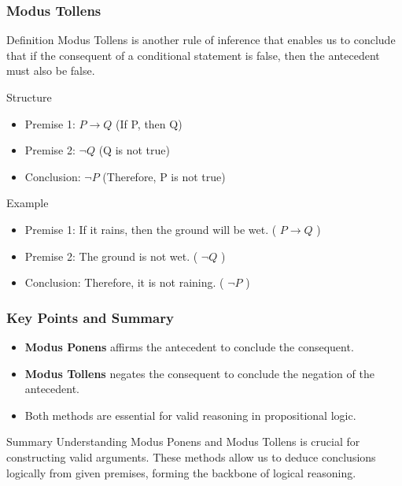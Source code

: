 \documentclass[aspectratio=169]{beamer}
\begin{document}
\begin{frame}[fragile]
    \frametitle{Modus Tollens}
    \begin{block}{Definition}
        Modus Tollens is another rule of inference that enables us to conclude that if the consequent of a conditional statement is false, then the antecedent must also be false.
    \end{block}
    \begin{block}{Structure}
        \begin{itemize}
            \item Premise 1: \( P \rightarrow Q \) (If P, then Q)
            \item Premise 2: \( \neg Q \) (Q is not true)
            \item Conclusion: \( \neg P \) (Therefore, P is not true)
        \end{itemize}
    \end{block}
    \begin{block}{Example}
        \begin{itemize}
            \item Premise 1: If it rains, then the ground will be wet. ( \( P \rightarrow Q \) )
            \item Premise 2: The ground is not wet. ( \( \neg Q \) )
            \item Conclusion: Therefore, it is not raining. ( \( \neg P \) )
        \end{itemize}
    \end{block}
\end{frame}

\begin{frame}[fragile]
    \frametitle{Key Points and Summary}
    \begin{itemize}
        \item \textbf{Modus Ponens} affirms the antecedent to conclude the consequent.
        \item \textbf{Modus Tollens} negates the consequent to conclude the negation of the antecedent.
        \item Both methods are essential for valid reasoning in propositional logic.
    \end{itemize}
    \begin{block}{Summary}
        Understanding Modus Ponens and Modus Tollens is crucial for constructing valid arguments. These methods allow us to deduce conclusions logically from given premises, forming the backbone of logical reasoning.
    \end{block}
\end{frame}
\end{document}
